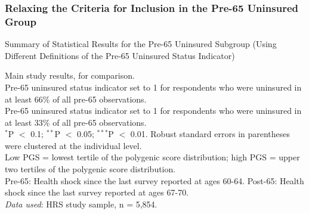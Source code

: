 \subsubsection{Relaxing the Criteria for Inclusion in the Pre-65 Uninsured Group}
\begin{table}[!ht]
	\centering
	\caption{Summary of Statistical Results for the Pre-65 Uninsured Subgroup (Using Different Definitions of the Pre-65 Uninsured Status Indicator)}
%	
	
		\footnotesize
		\begin{flushleft}
		Main study results, for comparison.\\
		Pre-65 uninsured status indicator set to 1 for respondents who were uninsured in at least 66\% of all pre-65 observations.\\
		Pre-65 uninsured status indicator set to 1 for respondents who were uninsured in at least 33\% of all pre-65 observations.\\
		$^{*}$P $<$ 0.1; $^{**}$P $<$ 0.05; $^{***}$P $<$ 0.01. Robust standard errors in parentheses were clustered at the individual level.\\
		Low PGS = lowest tertile of the polygenic score distribution; high PGS = upper two tertiles of the polygenic score distribution.\\
		Pre-65: Health shock since the last survey reported at ages 60-64. Post-65: Health shock since the last survey reported at ages 67-70.\\
		\textit{Data used}: HRS study sample, n = 5,854.
		\end{flushleft}
\end{table}

